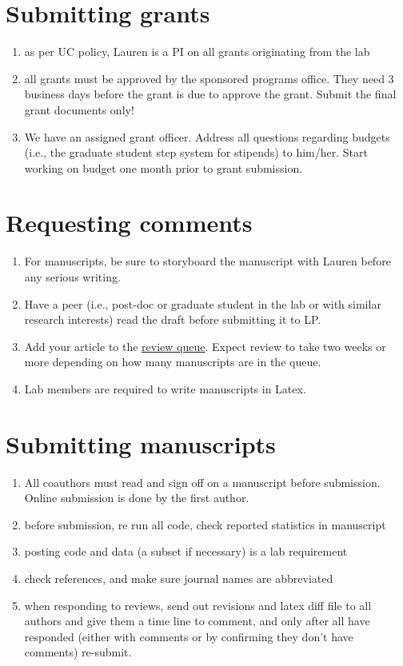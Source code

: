 \documentclass[12pt]{article}
\begin{document}
\section{Submitting grants}
\begin{enumerate}
\item as per UC policy, Lauren is a PI on all grants originating from
  the lab
\item all grants must be approved by the sponsored programs
  office. They need 3 business days before the grant is due to
  approve the grant. Submit the final grant documents only!
\item We have an assigned grant officer.  Address all questions
  regarding budgets (i.e., the graduate student step system for
  stipends) to him/her. Start working on budget one month prior to
  grant submission.
\end{enumerate}

\section{Requesting comments}
\begin{enumerate}
\item For manuscripts, be sure to storyboard the manuscript with
  Lauren before any serious writing.
\item Have a peer (i.e., post-doc or graduate student in the lab or
  with similar research interests) read the draft before submitting it
  to LP.
\item Add your article to the
  \href{https://docs.google.com/spreadsheets/d/1Of_AYtKQUZFwdj1hKwn0gYwD2m2cYB6bwNxYEiThTE0/edit?usp=sharing}
  {review queue}. Expect review to take two weeks or more depending on
  how many manuscripts are in the queue.
\item Lab members are required to write manuscripts in Latex.
\end{enumerate}

\section{Submitting manuscripts}
\begin{enumerate}
\item All coauthors must read and sign off on a manuscript before
  submission. Online submission is done by the first author.
\item before submission, re run all code, check reported statistics in
  manuscript
\item posting code and data (a subset if necessary) is a lab
  requirement
\item check references, and make sure journal names are abbreviated
\item when responding to reviews, send out revisions and latex diff
  file to all authors and give them a time line to comment, and only
  after all have responded (either with comments or by confirming they
  don't have comments) re-submit.
\end{enumerate}
\end{document}
